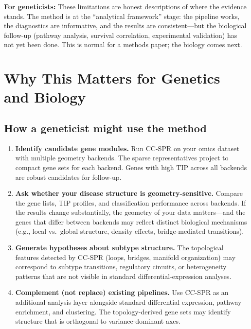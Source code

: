 \documentclass[11pt]{article}
\makeatletter
\newenvironment{biobox}{%
  \par\vspace{8pt}\noindent\fboxrule=1pt\fboxsep=8pt%
  \begin{lrbox}{\@tempboxa}\begin{minipage}{\dimexpr\linewidth-2\fboxsep-2\fboxrule}}%
  {\end{minipage}\end{lrbox}\fcolorbox{green!40!black}{white}{\usebox{\@tempboxa}}\par\vspace{8pt}}
\makeatother
\begin{document}
\begin{biobox}
\textbf{For geneticists:} These limitations are honest descriptions of where the evidence stands.
The method is at the ``analytical framework'' stage: the pipeline works, the diagnostics are informative, and the results are consistent---but the biological follow-up (pathway analysis, survival correlation, experimental validation) has not yet been done.
This is normal for a methods paper; the biology comes next.
\end{biobox}

\section{Why This Matters for Genetics and Biology}
\label{sec:whymatters}

\subsection{How a geneticist might use the method}

\begin{enumerate}[leftmargin=1.5em]
\item \textbf{Identify candidate gene modules.}
Run CC-SPR on your omics dataset with multiple geometry backends.
The sparse representatives project to compact gene sets for each backend.
Genes with high TIP across all backends are robust candidates for follow-up.

\item \textbf{Ask whether your disease structure is geometry-sensitive.}
Compare the gene lists, TIP profiles, and classification performance across backends.
If the results change substantially, the geometry of your data matters---and the genes that differ between backends may reflect distinct biological mechanisms (e.g., local vs.\ global structure, density effects, bridge-mediated transitions).

\item \textbf{Generate hypotheses about subtype structure.}
The topological features detected by CC-SPR (loops, bridges, manifold organization) may correspond to subtype transitions, regulatory circuits, or heterogeneity patterns that are not visible in standard differential-expression analyses.

\item \textbf{Complement (not replace) existing pipelines.}
Use CC-SPR as an additional analysis layer alongside standard differential expression, pathway enrichment, and clustering.
The topology-derived gene sets may identify structure that is orthogonal to variance-dominant axes.
\end{enumerate}
\end{document}
